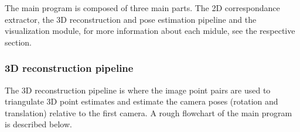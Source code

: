 The main program is composed of three main parts. The 2D correspondance extractor, the 3D reconstruction and pose estimation pipeline and the visualization module, for more information about each midule, see the respective section.


\subsubsection{3D reconstruction pipeline}
The 3D reconstruction pipeline is where the image point pairs are used to triangulate 3D point estimates and estimate the camera poses (rotation and translation) relative to the first camera. A rough flowchart of the main program is described below.